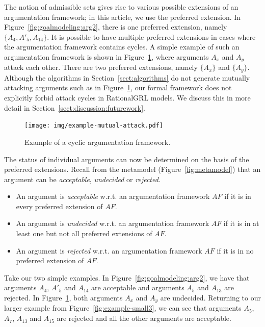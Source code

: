 The notion of admissible sets gives rise to various possible extensions of an argumentation framework; in this article, we use the preferred extension. In Figure~\ref{fig:goalmodeling:arg2}, there is one preferred extension, namely $\{A_4, A'_5, A_{14}\}$. It is possible to have multiple preferred extensions in cases where the argumentation framework contains cycles. A simple example of such an argumentation framework is shown in Figure~\ref{fig:goalmodeling:arg3}, where arguments $A_x$ and $A_y$ attack each other. There are two preferred extensions, namely $\{A_x\}$ and $\{A_y\}$. Although the algorithms in Section~\ref{sect:algorithms} do not generate mutually attacking arguments such as in Figure~\ref{fig:goalmodeling:arg3}, our formal framework does not explicitly forbid attack cycles in RationalGRL models. We discuss this in more detail in Section~\ref{sect:discussion:futurework}.

\begin{figure}[ht]
\centering
\texttt{[image: img/example-mutual-attack.pdf]}
\caption{Example of a cyclic argumentation framework.}
\label{fig:goalmodeling:arg3}
\end{figure}

The status of individual arguments can now be determined on the basis of the preferred extensions. Recall from the metamodel (Figure~\ref{fig:metamodel}) that an argument can be \emph{acceptable}, \emph{undecided} or \emph{rejected}. 

\begin{definition} 
\label{def:acceptability}
\begin{itemize}
\item An argument is \emph{acceptable} w.r.t. an argumentation framework $AF$ if it is in every preferred extension of $AF$. 
\item An argument is \emph{undecided} w.r.t. an argumentation framework $AF$ if it is in at least one but not all preferred extensions of $AF$. 
\item An argument is \emph{rejected} w.r.t. an argumentation framework $AF$ if it is in no preferred extension of $AF$. 
\end{itemize}
\end{definition}

Take our two simple examples. In Figure~\ref{fig:goalmodeling:arg2}, we have that arguments $A_4$, $A'_5$ and $A_{14}$ are acceptable and arguments $A_5$ and $A_{13}$ are rejected. In Figure~\ref{fig:goalmodeling:arg3}, both arguments $A_x$ and $A_y$ are undecided. Returning to our larger example from Figure~\ref{fig:example-small3}, we can see that arguments $A_5$, $A_7$, $A_{13}$ and $A_{15}$ are rejected and all the other arguments are acceptable.

